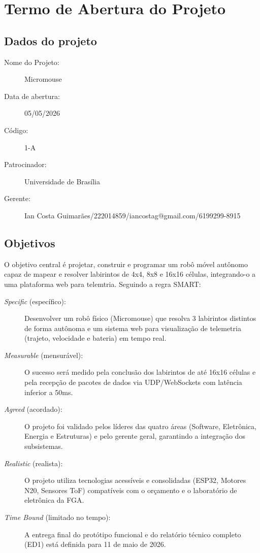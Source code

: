 \chapter{Termo de Abertura do Projeto}
\label{termo}

\section{Dados do projeto}
\begin{description}
    \item [Nome do Projeto:] Micromouse
    \item [Data de abertura:] 05/05/2026
    \item [Código:] 1-A
    \item [Patrocinador:] Universidade de Brasília
    \item [Gerente:] Ian Costa Guimarães/222014859/iancostag@gmail.com/6199299-8915
\end{description}

\section{Objetivos}
O objetivo central é projetar, construir e programar um robô móvel autônomo capaz de mapear e resolver labirintos de 4x4, 8x8 e 16x16 células, integrando-o a uma plataforma web para telemtria. Seguindo a regra SMART:
\begin{description}
    \item [\textit{Specific} (específico):] Desenvolver um robô físico (Micromouse) que resolva 3 labirintos distintos de forma autônoma e um sistema web para visualização de telemetria (trajeto, velocidade e bateria) em tempo real.
    \item [\textit{Measurable} (mensurável):] O sucesso será medido pela conclusão dos labirintos de até 16x16 células e pela recepção de pacotes de dados via UDP/WebSockets com latência inferior a 50ms.
    \item [\textit{Agreed} (acordado):] O projeto foi validado pelos líderes das quatro áreas (Software, Eletrônica, Energia e Estruturas) e pelo gerente geral, garantindo a integração dos subsistemas.
    \item [\textit{Realistic} (realista):] O projeto utiliza tecnologias acessíveis e consolidadas (ESP32, Motores N20, Sensores ToF) compatíveis com o orçamento e o laboratório de eletrônica da FGA.
    \item [\textit{Time Bound} (limitado no tempo):] A entrega final do protótipo funcional e do relatório técnico completo (ED1) está definida para 11 de maio de 2026.
\end{description}

